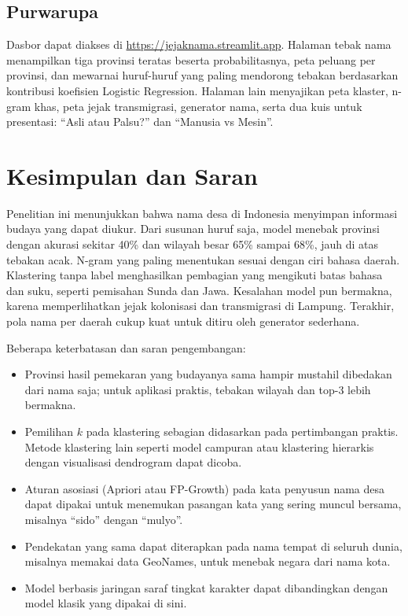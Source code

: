 \documentclass[conference]{IEEEtran}
\begin{document}
\subsection{Purwarupa}

Dasbor dapat diakses di \url{https://jejaknama.streamlit.app}. Halaman tebak nama menampilkan tiga provinsi teratas beserta probabilitasnya, peta peluang per provinsi, dan mewarnai huruf-huruf yang paling mendorong tebakan berdasarkan kontribusi koefisien Logistic Regression. Halaman lain menyajikan peta klaster, n-gram khas, peta jejak transmigrasi, generator nama, serta dua kuis untuk presentasi: ``Asli atau Palsu?'' dan ``Manusia vs Mesin''.

\section{Kesimpulan dan Saran}

Penelitian ini menunjukkan bahwa nama desa di Indonesia menyimpan informasi budaya yang dapat diukur. Dari susunan huruf saja, model menebak provinsi dengan akurasi sekitar 40\% dan wilayah besar 65\% sampai 68\%, jauh di atas tebakan acak. N-gram yang paling menentukan sesuai dengan ciri bahasa daerah. Klastering tanpa label menghasilkan pembagian yang mengikuti batas bahasa dan suku, seperti pemisahan Sunda dan Jawa. Kesalahan model pun bermakna, karena memperlihatkan jejak kolonisasi dan transmigrasi di Lampung. Terakhir, pola nama per daerah cukup kuat untuk ditiru oleh generator sederhana.

Beberapa keterbatasan dan saran pengembangan:
\begin{itemize}
\item Provinsi hasil pemekaran yang budayanya sama hampir mustahil dibedakan dari nama saja; untuk aplikasi praktis, tebakan wilayah dan top-3 lebih bermakna.
\item Pemilihan $k$ pada klastering sebagian didasarkan pada pertimbangan praktis. Metode klastering lain seperti model campuran atau klastering hierarkis dengan visualisasi dendrogram dapat dicoba.
\item Aturan asosiasi (Apriori atau FP-Growth) pada kata penyusun nama desa dapat dipakai untuk menemukan pasangan kata yang sering muncul bersama, misalnya ``sido'' dengan ``mulyo''.
\item Pendekatan yang sama dapat diterapkan pada nama tempat di seluruh dunia, misalnya memakai data GeoNames, untuk menebak negara dari nama kota.
\item Model berbasis jaringan saraf tingkat karakter dapat dibandingkan dengan model klasik yang dipakai di sini.
\end{itemize}
\end{document}
